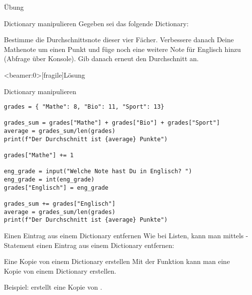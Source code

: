 \begin{frame}{Übung}

\begin{block}{Dictionary manipulieren}
	\vspace{2pt}
	Gegeben sei das folgende Dictionary: 
	
	
	Bestimme die Durchschnittsnote dieser vier Fächer. Verbessere danach Deine Mathenote um einen Punkt und füge noch eine weitere Note für Englisch hinzu (Abfrage über Konsole). Gib danach erneut den Durchschnitt an.  
\end{block}

\end{frame}


\begin{frame}<beamer:0>[fragile]{Lösung}

\begin{solutionblock}{Dictionary manipulieren}
\begin{verbatim}
grades = { "Mathe": 8, "Bio": 11, "Sport": 13}

grades_sum = grades["Mathe"] + grades["Bio"] + grades["Sport"]
average = grades_sum/len(grades)
print(f"Der Durchschnitt ist {average} Punkte")

grades["Mathe"] += 1

eng_grade = input("Welche Note hast Du in Englisch? ")
eng_grade = int(eng_grade)
grades["Englisch"] = eng_grade

grades_sum += grades["Englisch"]
average = grades_sum/len(grades)
print(f"Der Durchschnitt ist {average} Punkte")
\end{verbatim}
\end{solutionblock}
\end{frame}



\begin{frame}
\begin{block}{Einen Eintrag aus einem Dictionary entfernen}
\vspace{2pt}
Wie bei Listen, kann man mittels -Statement einen Eintrag aus einem Dictionary entfernen: 


\end{block}	

\vspace{12pt}
\pause 

\begin{block}{Eine Kopie von einem Dictionary erstellen}
	\vspace{2pt}
Mit der Funktion  kann man eine Kopie von einem Dictionary erstellen. 

Beispiel:  erstellt eine Kopie von .
\end{block}


\end{frame}	



